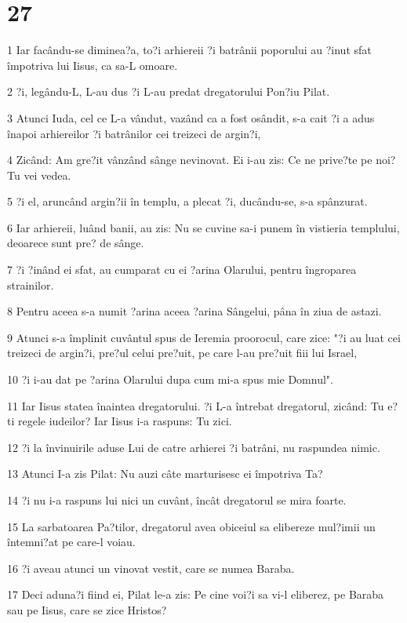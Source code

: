 \chapter{27}

\par 1 Iar facându-se diminea?a, to?i arhiereii ?i batrânii poporului au ?inut sfat împotriva lui Iisus, ca sa-L omoare.
\par 2 ?i, legându-L, L-au dus ?i L-au predat dregatorului Pon?iu Pilat.
\par 3 Atunci Iuda, cel ce L-a vândut, vazând ca a fost osândit, s-a cait ?i a adus înapoi arhiereilor ?i batrânilor cei treizeci de argin?i,
\par 4 Zicând: Am gre?it vânzând sânge nevinovat. Ei i-au zis: Ce ne prive?te pe noi? Tu vei vedea.
\par 5 ?i el, aruncând argin?ii în templu, a plecat ?i, ducându-se, s-a spânzurat.
\par 6 Iar arhiereii, luând banii, au zis: Nu se cuvine sa-i punem în vistieria templului, deoarece sunt pre? de sânge.
\par 7 ?i ?inând ei sfat, au cumparat cu ei ?arina Olarului, pentru îngroparea strainilor.
\par 8 Pentru aceea s-a numit ?arina aceea ?arina Sângelui, pâna în ziua de astazi.
\par 9 Atunci s-a împlinit cuvântul spus de Ieremia proorocul, care zice: "?i au luat cei treizeci de argin?i, pre?ul celui pre?uit, pe care l-au pre?uit fiii lui Israel,
\par 10 ?i i-au dat pe ?arina Olarului dupa cum mi-a spus mie Domnul".
\par 11 Iar Iisus statea înaintea dregatorului. ?i L-a întrebat dregatorul, zicând: Tu e?ti regele iudeilor? Iar Iisus i-a raspuns: Tu zici.
\par 12 ?i la învinuirile aduse Lui de catre arhierei ?i batrâni, nu raspundea nimic.
\par 13 Atunci I-a zis Pilat: Nu auzi câte marturisesc ei împotriva Ta?
\par 14 ?i nu i-a raspuns lui nici un cuvânt, încât dregatorul se mira foarte.
\par 15 La sarbatoarea Pa?tilor, dregatorul avea obiceiul sa elibereze mul?imii un întemni?at pe care-l voiau.
\par 16 ?i aveau atunci un vinovat vestit, care se numea Baraba.
\par 17 Deci aduna?i fiind ei, Pilat le-a zis: Pe cine voi?i sa vi-l eliberez, pe Baraba sau pe Iisus, care se zice Hristos?
